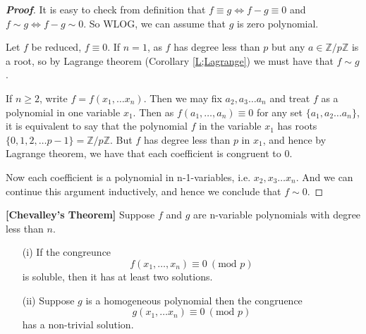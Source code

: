 \begin{proof}[\bf Proof] It is easy to check from definition that $f \equiv g \iff f-g \equiv 0$ and $f \sim g \iff f-g \sim 0$. So WLOG, we can assume that $g$ is zero polynomial.

Let $f$ be reduced, $f \equiv 0$. If $n=1$, as $f$ has degree less than $p$ but any $a \in \mathbb{Z}/p\mathbb{Z}$ is a root, so by Lagrange theorem (Corollary \ref{L;Lagrange}) we must have that $f \sim g$.

If $n \ge 2$, write $f=f(x_1,\ldots x_n)$. Then we may fix $a_2,a_3 \ldots a_n$ and treat $f$ as a polynomial in one variable $x_1$. Then as $f(a_1, \ldots, a_n) \equiv 0$ for any set $\{a_1,a_2 \ldots a_n\}$, it is equivalent to say that the polynomial $f$ in the variable $x_1$ has roots $\{0,1,2, \ldots p-1\}=\mathbb{Z}/p\mathbb{Z}$. But $f$ has degree less than $p$ in $x_1$, and hence by Lagrange theorem, we have that each coefficient is congruent to $0$.

Now each coefficient is a polynomial in n-1-variables, i.e. $x_2,x_3 \ldots x_n$. And we can continue this argument inductively, and hence we conclude that $f \sim 0$.
\end{proof}
\begin{theorem}{\bf [Chevalley's Theorem]}\label{C;Chevalley} Suppose $f$ and $g$ are n-variable polynomials with degree less than $n$.
\begin{enumerate}
\item[(i)] If the congreunce
\begin{equation*} f(x_1, \ldots, x_n) \equiv 0~(\text{mod } p) \end{equation*}
is soluble, then it has at least two solutions.
\item[(ii)] Suppose $g$ is a homogeneous polynomial then the congruence
$$g(x_1,\ldots x_n) \equiv 0~(\text{mod } p)$$ has a non-trivial solution.
\end{enumerate}
\end{theorem}
